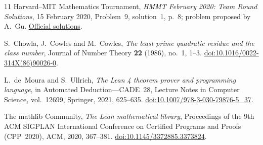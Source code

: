 \documentclass[11pt,a4paper]{article}
\theoremstyle{remark}
\numberwithin{equation}{section}
\begin{document}
\begin{thebibliography}{11}
Harvard--MIT Mathematics Tournament,
\emph{HMMT February 2020: Team Round Solutions}, 15 February 2020,
Problem~9, solution~1, p.~8; problem proposed by A.~Gu.
\href{https://hmmt-archive.s3.amazonaws.com/tournaments/2020/feb/team/solutions.pdf}{Official solutions}.

S.~Chowla, J.~Cowles and M.~Cowles,
\emph{The least prime quadratic residue and the class number},
Journal of Number Theory \textbf{22} (1986), no.~1, 1--3.
\href{https://doi.org/10.1016/0022-314X(86)90026-0}{doi:10.1016/0022-314X(86)90026-0}.

L.~de~Moura and S.~Ullrich,
\emph{The Lean 4 theorem prover and programming language},
in Automated Deduction---CADE~28, Lecture Notes in Computer Science,
vol.~12699, Springer, 2021, 625--635.
\href{https://doi.org/10.1007/978-3-030-79876-5_37}{doi:10.1007/978-3-030-79876-5\_37}.

The mathlib Community,
\emph{The Lean mathematical library},
Proceedings of the 9th ACM SIGPLAN International Conference on Certified
Programs and Proofs (CPP~2020), ACM, 2020, 367--381.
\href{https://doi.org/10.1145/3372885.3373824}{doi:10.1145/3372885.3373824}.

\end{thebibliography}
\end{document}
